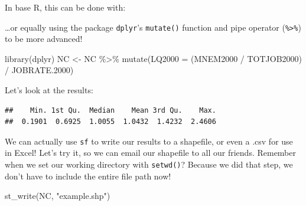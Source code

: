 \documentclass[
]{article}
\newenvironment{Shaded}{\begin{snugshade}}{\end{snugshade}}
\newcommand{\AttributeTok}[1]{\textcolor[rgb]{0.77,0.63,0.00}{#1}}
\newcommand{\FloatTok}[1]{\textcolor[rgb]{0.00,0.00,0.81}{#1}}
\newcommand{\FunctionTok}[1]{\textcolor[rgb]{0.00,0.00,0.00}{#1}}
\newcommand{\NormalTok}[1]{#1}
\newcommand{\OtherTok}[1]{\textcolor[rgb]{0.56,0.35,0.01}{#1}}
\newcommand{\SpecialCharTok}[1]{\textcolor[rgb]{0.00,0.00,0.00}{#1}}
\newcommand{\StringTok}[1]{\textcolor[rgb]{0.31,0.60,0.02}{#1}}
\begin{document}
In base R, this can be done with:

\begin{Shaded}
\end{Shaded}

\ldots or equally using the package \texttt{dplyr}'s \texttt{mutate()}
function and pipe operator (\texttt{\%\textgreater{}\%}) to be more
advanced!

\begin{Shaded}
\begin{Highlighting}[]
\FunctionTok{library}\NormalTok{(dplyr)}
\NormalTok{NC }\OtherTok{\textless{}{-}}\NormalTok{ NC }\SpecialCharTok{\%\textgreater{}\%}
  \FunctionTok{mutate}\NormalTok{(}\AttributeTok{LQ2000 =}\NormalTok{ (MNEM2000 }\SpecialCharTok{/}\NormalTok{ TOTJOB2000) }\SpecialCharTok{/}\NormalTok{ JOBRATE}\FloatTok{.2000}\NormalTok{)}
\end{Highlighting}
\end{Shaded}

Let's look at the results:

\begin{Shaded}
\end{Shaded}

\begin{verbatim}
##    Min. 1st Qu.  Median    Mean 3rd Qu.    Max. 
##  0.1901  0.6925  1.0055  1.0432  1.4232  2.4606
\end{verbatim}

We can actually use \texttt{sf} to write our results to a shapefile, or
even a .csv for use in Excel! Let's try it, so we can email our
shapefile to all our friends. Remember when we set our working directory
with \texttt{setwd()}? Because we did that step, we don't have to
include the entire file path now!

\begin{Shaded}
\begin{Highlighting}[]
\FunctionTok{st\_write}\NormalTok{(NC, }\StringTok{"example.shp"}\NormalTok{)}
\end{Highlighting}
\end{Shaded}
\end{document}
